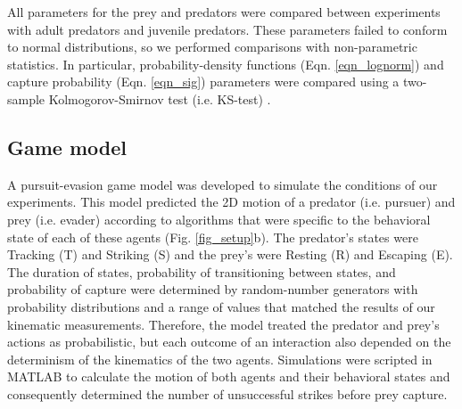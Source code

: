 \documentclass[]{rsos}%
\begin{document}
All parameters for the prey and predators were compared between experiments with adult predators and juvenile predators.
These parameters failed to conform to normal distributions, so we performed comparisons with non-parametric statistics. 
In particular, probability-density functions (Eqn. \ref{eqn_lognorm}) and capture probability (Eqn. \ref{eqn_sig}) parameters were compared using a two-sample Kolmogorov-Smirnov test (i.e. KS-test) \cite{MasseyJr:1951jo}. 

\subsection{Game model}
A pursuit-evasion game model was developed to simulate the conditions of our experiments. 
This model predicted the 2D motion of a predator (i.e. pursuer) and prey (i.e. evader) according to algorithms that were specific to the behavioral state of each of these agents (Fig. \ref{fig_setup}b). 
The predator's states were Tracking (T) and Striking (S) and the prey's were Resting (R) and Escaping (E). 
The duration of states, probability of transitioning between states, and probability of capture were determined by random-number generators with probability distributions and a range of values that matched the results of our kinematic measurements.
Therefore, the model treated the predator and prey's actions as probabilistic, but each outcome of an interaction also depended on the determinism of the kinematics of the two agents.
Simulations were scripted in MATLAB to calculate the motion of both agents and their behavioral states and consequently determined the number of unsuccessful strikes before prey capture.
\end{document}
